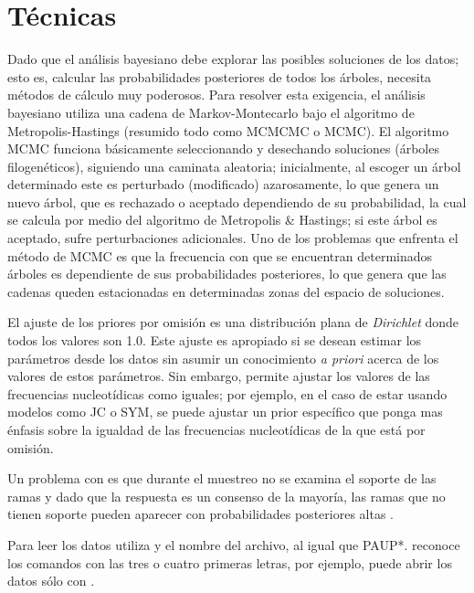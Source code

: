 \section*{T\'ecnicas}
Dado que el an\'alisis bayesiano debe explorar las posibles soluciones de los datos; esto es, calcular las probabilidades posteriores de todos los \'arboles, necesita m\'etodos de c\'alculo muy poderosos. Para resolver esta exigencia, el an\'alisis bayesiano utiliza una cadena de Markov-Montecarlo bajo el algoritmo de Metropolis-Hastings (resumido todo como MCMCMC o MCMC). El algoritmo MCMC funciona b\'asicamente seleccionando y desechando 
soluciones (\'arboles filogen\'eticos), siguiendo una caminata aleatoria; inicialmente, al escoger un \'arbol determinado este es perturbado (modificado) azarosamente, lo que genera un nuevo \'arbol, que es rechazado o aceptado dependiendo de su probabilidad, la cual se calcula por medio del algoritmo de Metropolis \& Hastings; si este \'arbol es aceptado, sufre perturbaciones adicionales. Uno de los problemas que enfrenta el m\'etodo de MCMC es que la frecuencia con que se encuentran  determinados \'arboles es dependiente de sus probabilidades posteriores, lo que genera que las cadenas queden estacionadas en determinadas zonas del espacio de soluciones.

El ajuste de los priores por omisi\'on es una distribuci\'on plana de \textit{Dirichlet} donde todos los valores son 1.0. Este ajuste es apropiado si se desean estimar los par\'ametros desde los datos sin asumir un conocimiento \textit{a priori} acerca de los valores de estos par\'ametros. Sin embargo,   permite ajustar los valores de las frecuencias nucleot\'idicas como iguales; por ejemplo, en el caso de estar usando modelos como JC o SYM, se puede ajustar un prior espec\'ifico que ponga mas \'enfasis sobre la igualdad de las frecuencias nucleot\'idicas de la que est\'a por omisi\'on.

Un problema con  es que durante el muestreo no se examina el soporte de las ramas y dado que la respuesta es un consenso de la mayor\'ia, las ramas que no tienen soporte pueden aparecer con probabilidades posteriores altas \cite{Goloboff2005}.


Para leer los datos  utiliza  y el nombre del archivo, al igual que {PAUP*}.  reconoce los comandos con las tres o cuatro primeras letras, por ejemplo, puede abrir los datos s\'olo con .


